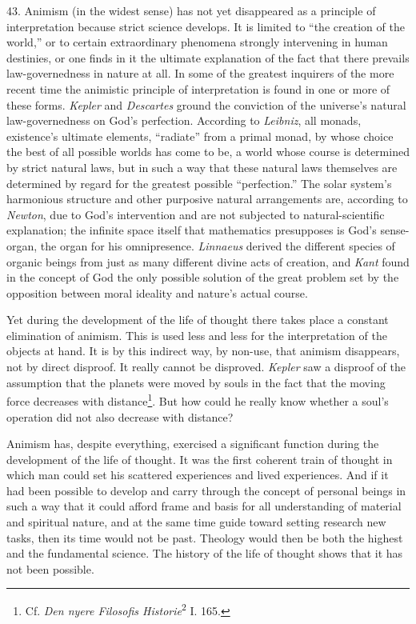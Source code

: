 \documentclass[12pt,a4paper]{book}
\newcommand{\opage}[1]{\marginnote{\footnotesize\textit{[#1]}}}
\begin{document}
43. Animism (in the widest sense) has not yet disappeared as a principle of
interpretation because strict science develops. It is limited to ``the
creation of the world,'' or to certain extraordinary phenomena strongly
intervening in human destinies, or one finds in it the ultimate explanation
of the fact that there prevails law-governedness in nature at all. In some
of the greatest inquirers of the more recent time the animistic principle
of interpretation is found in one or more of these forms. \emph{Kepler} and
\emph{Descartes} ground the conviction of the universe's natural
law-governedness on God's perfection. According to \emph{Leibniz}, all
monads, existence's ultimate elements, ``radiate'' from a primal monad, by
whose choice the best of all possible worlds has come to be, a world whose
course is determined by strict natural laws, but in such a way that these
natural laws themselves are determined by regard for the greatest possible
``perfection.'' The solar system's harmonious structure and other purposive
natural arrangements are, according to \emph{Newton}, due to God's
intervention and are not subjected to natural-scientific explanation; the
infinite space itself that mathematics presupposes is God's sense-organ,
\opage{117}the organ for his omnipresence. \emph{Linnaeus} derived the different
species of organic beings from just as many different divine acts of
creation, and \emph{Kant} found in the concept of God the only possible
solution of the great problem set by the opposition between moral ideality
and nature's actual course.

Yet during the development of the life of thought there takes place a
constant elimination of animism. This is used less and less for the
interpretation of the objects at hand. It is by this indirect way, by
non-use, that animism disappears, not by direct disproof. It really cannot
be disproved. \emph{Kepler} saw a disproof of the assumption that the
planets were moved by souls in the fact that the moving force decreases with
distance\footnote{Cf. \emph{Den nyere Filosofis Historie}\textsuperscript{2}
I. 165.}. But how could he really know whether a soul's operation did not
also decrease with distance?

Animism has, despite everything, exercised a significant function during
the development of the life of thought. It was the first coherent train of
thought in which man could set his scattered experiences and lived
experiences. And if it had been possible to develop and carry through the
concept of personal beings in such a way that it could afford frame and
basis for all understanding of material and spiritual nature, and at the
same time guide toward setting research new tasks, then its time would not
be past. Theology would then be both the highest and the fundamental
science. The history of the life of thought shows that it has not been
possible.
\end{document}
